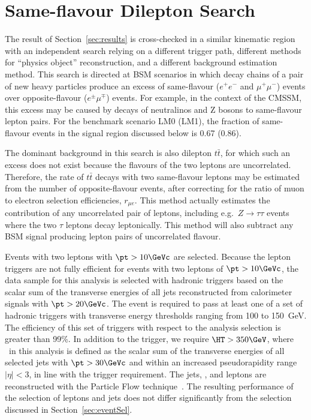 \section{Same-flavour Dilepton Search}
\label{sec:HT} 

The result of Section~\ref{sec:results} is cross-checked in a similar kinematic region with an 
independent
search relying on a different trigger path, different methods for ``physics object'' reconstruction, and a
different background estimation method. 
This search is directed at BSM scenarios in which decay chains of a pair of new heavy particles
produce an excess of same-flavour ($e^{+}e^{-}$ and $\mu^{+}\mu^{-}$) events over opposite-flavour ($e^{\pm}\mu^{\mp}$) events. 
For example, in the context of the CMSSM, this excess may be caused by decays of neutralinos and Z bosons to same-flavour lepton pairs. 
For the benchmark scenario LM0 (LM1), the fraction of same-flavour events in the signal region discussed
below is 0.67 (0.86).

The dominant background in this search is also dilepton $t\bar{t}$, for which such an excess does not exist 
because the flavours of the two leptons are uncorrelated.
Therefore, the rate of $t\bar{t}$ decays with two  same-flavour leptons 
may be estimated from the number of opposite-flavour events, 
after correcting for the 
ratio of muon to electron selection efficiencies, $r_{\mu{}e}$. 
This method actually estimates the contribution of any uncorrelated pair of leptons, including
e.g.\ $Z\to\tau\tau$ events where the two $\tau$ leptons decay leptonically. 
This method will also subtract any BSM signal producing lepton pairs of uncorrelated flavour.

Events with two leptons with $\pt>10\GeVc$ are selected. Because the lepton triggers are not fully
efficient for events with two leptons of $\pt>10\GeVc$,
the data sample for this analysis is selected with hadronic triggers based on the
scalar sum of the transverse energies of all jets reconstructed from calorimeter signals with $\pt>20\GeVc$. 
The event is required to pass at least one of a set of hadronic triggers with transverse energy thresholds
ranging from 100 to 150~GeV. The efficiency of this set of triggers with respect to the analysis selection is
greater than 99\%.
In addition to the trigger, we require $\HT>350\GeV$, 
where \HT\ in this analysis is defined as the scalar sum of 
the transverse energies of all selected jets with $\pt>30\GeVc$
and within an increased pseudorapidity range $|\eta|<3$, in line with the trigger requirement.
The jets, \MET, and leptons are reconstructed with the Particle Flow technique~\cite{CMS-PAS-PFT-10-002}.
The resulting performance of the selection of leptons and jets does not differ 
significantly from the selection discussed  in Section~\ref{sec:eventSel}.  

